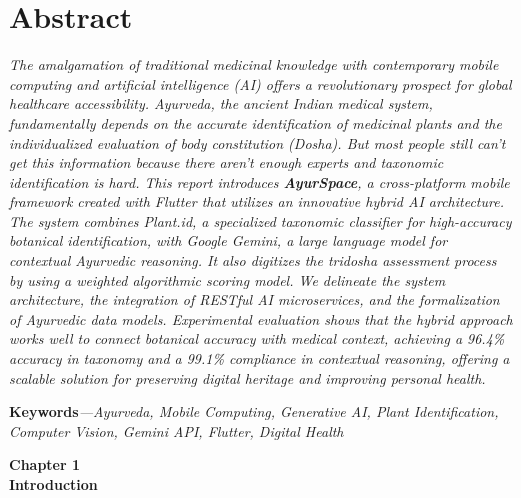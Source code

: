 \documentclass[12pt, a4paper]{report}
\begin{document}
\newpage
\chapter*{Abstract}

\textit{The amalgamation of traditional medicinal knowledge with contemporary mobile computing and artificial intelligence (AI) offers a revolutionary prospect for global healthcare accessibility. Ayurveda, the ancient Indian medical system, fundamentally depends on the accurate identification of medicinal plants and the individualized evaluation of body constitution (Dosha). But most people still can't get this information because there aren't enough experts and taxonomic identification is hard. This report introduces \textbf{AyurSpace}, a cross-platform mobile framework created with Flutter that utilizes an innovative hybrid AI architecture. The system combines Plant.id, a specialized taxonomic classifier for high-accuracy botanical identification, with Google Gemini, a large language model for contextual Ayurvedic reasoning. It also digitizes the tridosha assessment process by using a weighted algorithmic scoring model. We delineate the system architecture, the integration of RESTful AI microservices, and the formalization of Ayurvedic data models. Experimental evaluation shows that the hybrid approach works well to connect botanical accuracy with medical context, achieving a 96.4\% accuracy in taxonomy and a 99.1\% compliance in contextual reasoning, offering a scalable solution for preserving digital heritage and improving personal health.
}

\textbf{Keywords}\textit{—Ayurveda, Mobile Computing, Generative AI, Plant Identification, Computer Vision, Gemini API, Flutter, Digital Health}
\newpage
{\setcounter{page}{1}}
\vspace*{\fill}
\begin{center}
\textbf{\Huge{Chapter 1}}\\
\vspace{5mm}
\textbf{\Huge{Introduction}}
\end{center}
\vspace*{\fill}
\newpage
\titleformat{\chapter}[block]{\normalfont}{}{0pt}{}
\titlespacing{\chapter}{0pt}{-2em}{0pt}
\end{document}
